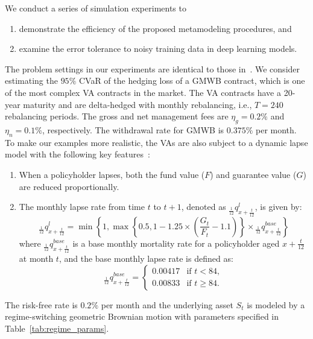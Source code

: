 We conduct a series of simulation experiments to 
\begin{enumerate}
    \item demonstrate the efficiency of the proposed metamodeling procedures, and
    \item examine the error tolerance to noisy training data in deep learning models.
\end{enumerate}
The problem settings in our experiments are identical to those in~\cite{dang2020efficient}.
We consider estimating the $95\%$ CVaR of the hedging loss of a GMWB contract, which is one of the most complex VA contracts in the market.
The VA contracts have a 20-year maturity and are delta-hedged with monthly rebalancing, i.e., $T=240$ rebalancing periods.
The gross and net management fees are $\eta_g = 0.2\%$ and $\eta_n=0.1\%$, respectively.
The withdrawal rate for GMWB is $0.375\%$ per month.
To make our examples more realistic, the VAs are also subject to a dynamic lapse model with the following key features~\citep{naic2021}:
\begin{enumerate}
    \item When a policyholder lapses, both the fund value ($F$) and guarantee value ($G$) are reduced proportionally.
    \item The monthly lapse rate from time $t$ to $t + 1$, denoted as ${}_{\frac{1}{12}}q^l_{x+\frac{t}{12}}$, is given by:
    \begin{equation}
        {}_{\frac{1}{12}}q^l_{x+\frac{t}{12}} = \min\left\{1, \max\left\{0.5, 1 - 1.25 \times \left(\frac{G_t}{F_t} - 1.1\right)\right\} \times {}_{\frac{1}{12}}q^{base}_{x+\frac{t}{12}}\right\}
    \end{equation}
    where ${}_{\frac{1}{12}}q^{base}_{x+\frac{t}{12}}$ is a base monthly mortality rate for a policyholder aged $x + \frac{t}{12}$ at month $t$, and the base monthly lapse rate is defined as:
    \begin{equation}
        {}_{\frac{1}{12}}q^{base}_{x+\frac{t}{12}} = 
        \begin{cases}
            0.00417 & \text{if } t < 84, \\
            0.00833 & \text{if } t \geq 84.
        \end{cases}
    \end{equation}
\end{enumerate}

The risk-free rate is $0.2\%$ per month and the underlying asset $S_t$ is modeled by a regime-switching geometric Brownian motion with parameters specified in Table~\ref{tab:regime_params}.

